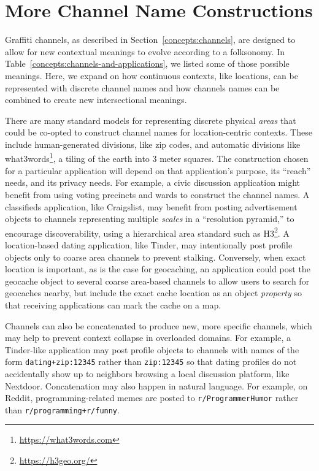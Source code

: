 \section{More Channel Name Constructions}

Graffiti channels, as described in
Section~\ref{concepts:channels},
are designed to allow for new contextual meanings to evolve according to a folksonomy.
In Table~\ref{concepts:channels-and-applications},
we listed some of those possible meanings.
Here, we expand on how continuous
contexts, like locations, can be represented with
discrete channel names and how channels names
can be combined to create new
intersectional meanings.


There are many standard models for representing
discrete physical \emph{areas} that could be co-opted to construct channel
names for location-centric contexts. These include
human-generated divisions, like zip codes,
and automatic divisions like what3words\footnote{
    \url{https://what3words.com}
}, a tiling of the earth into 3 meter squares.
The construction chosen for a particular application will
depend on that application's purpose,
its ``reach'' needs, and its privacy needs.
For example, a civic discussion application
might benefit from using voting precincts and wards
to construct the channel names.
A classifieds application, like Craigslist, may benefit from posting
advertisement objects to channels representing multiple \emph{scales}
in a ``resolution pyramid,'' to encourage discoverability,
using a hierarchical area standard such as H3\footnote{
    \url{https://h3geo.org/}
}.
A location-based dating application, like Tinder, may intentionally
post profile objects only to coarse area channels to prevent stalking.
Conversely, when exact location is important,
as is the case for geocaching, an application could post the geocache
object to several coarse area-based channels to allow users
to search for geocaches nearby, but include
the exact cache location as an object \emph{property}
so that receiving applications can mark the cache on a map.

Channels can also be concatenated to produce new, more specific channels,
which may help to prevent context collapse in overloaded domains.
For example, a Tinder-like application may post profile objects
to channels with names of the form
\texttt{dating+\allowbreak{}zip:\allowbreak{}12345} rather than
\texttt{zip:\allowbreak{}12345} so that dating profiles
do not accidentally show up to neighbors browsing a local
discussion platform, like Nextdoor.
Concatenation may also happen in natural language.
For example, on Reddit,
programming-related memes are posted to \texttt{r/\allowbreak{}Programmer\allowbreak{}Humor}
rather than \texttt{r/\allowbreak{}programming+\allowbreak{}r/funny}.


